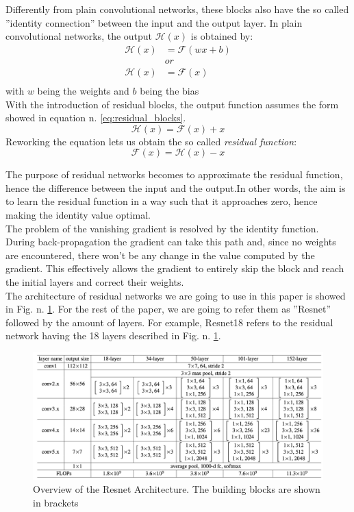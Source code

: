 Differently from plain convolutional networks, these blocks also have the so called ''identity connection'' between the input and the output layer. 
In plain convolutional networks, the output $\mathcal{H}(x)$ is obtained by:
\begin{align*}
\mathcal{H}(x) &= \mathcal{F}(wx + b)\\
               &or\\
\mathcal{H}(x) &= \mathcal{F}(x)\\   
\end{align*}
with $w$ being the weights and $b$ being the bias\\
With the introduction of residual blocks, the output function assumes the form showed in equation n. \ref{eq:residual_blocks}.
\begin{equation}
\mathcal{H}(x) = \mathcal{F}(x) + x
\label{eq:residual_blocks}   
\end{equation}
Reworking the equation lets us obtain the so called \textit{residual function}: 
\begin{equation}
\mathcal{F}(x) = \mathcal{H}(x) - x
\label{eq:residual_function}   
\end{equation}

The purpose of residual networks becomes to approximate the residual function, hence the difference between the input and the output.In other words, the aim is to learn the residual function in a way such that it approaches zero, hence making the identity value optimal. \\
The problem of the vanishing gradient is resolved by the identity function. During back-propagation the gradient can take this path and, since no weights are encountered, there won't be any change in the value computed by the gradient. This effectively allows the gradient to entirely skip the block and reach the initial layers and correct their weights. \\
The architecture of residual networks we are going to use in this paper is showed in Fig. n. \ref{fig:resnet_arch}. For the rest of the paper, we are going to refer them as ''Resnet'' followed by the amount of layers. For example, Resnet18 refers to the residual network having the 18 layers described in Fig. n.  \ref{fig:resnet_arch}. 
\begin{figure}[t]
    \centering
    \includegraphics[scale = 0.5]{img/resnet_arch.png}
    \caption[Overview of the Resnet Architecture]{Overview of the Resnet Architecture. The building blocks are shown in brackets \cite{DBLP:journals/corr/HeZRS15}}
    \label{fig:resnet_arch}
\end{figure}


